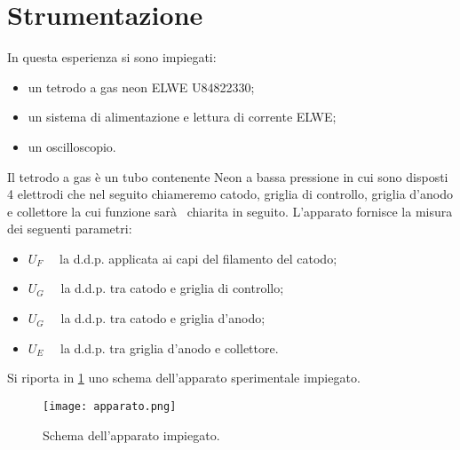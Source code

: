 \section{Strumentazione}
	In questa esperienza si sono impiegati:
	\begin{itemize}
	\item un tetrodo a gas neon ELWE U84822330;
	\item un sistema di alimentazione e lettura di corrente ELWE;
	\item un oscilloscopio.
	\end{itemize}

Il tetrodo a gas è un tubo contenente Neon a bassa pressione in cui sono disposti 4 elettrodi che nel seguito chiameremo catodo, griglia di controllo, griglia d'anodo e collettore la cui funzione sarà  chiarita in seguito.
L'apparato fornisce la misura dei seguenti parametri:
\begin{itemize}
	\item $U_F\quad$	la d.d.p. applicata ai capi del filamento del catodo;
	\item $U_G\quad$	la d.d.p. tra catodo e griglia di controllo;
	\item $U_G\quad$	la d.d.p. tra catodo e griglia d'anodo;
	\item $U_E\quad$	la d.d.p. tra griglia d'anodo e collettore.
\end{itemize}

Si riporta in \figurename{ \ref{fig:apparato}} uno schema
	dell'apparato sperimentale impiegato.
	\begin{figure} [!h]
		\centering
		\texttt{[image: apparato.png]}
		\caption{Schema dell'apparato impiegato.}
		\label{fig:apparato}
	\end{figure}
